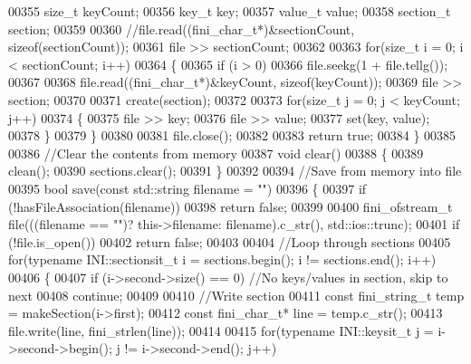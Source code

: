 \begin{DoxyCode}
00355       \textcolor{keywordtype}{size\_t} keyCount;
00356       key\_t key;
00357       value\_t value;
00358       section\_t section;
00359 
00360       \textcolor{comment}{//file.read((fini\_char\_t*)&sectionCount, sizeof(sectionCount));}
00361       file >> sectionCount;
00362 
00363       \textcolor{keywordflow}{for}(\textcolor{keywordtype}{size\_t} i = 0; i < sectionCount; i++)
00364       \{
00365          \textcolor{keywordflow}{if} (i > 0)
00366             file.seekg(1 + file.tellg());
00367 
00368          file.read((fini_char_t*)&keyCount, \textcolor{keyword}{sizeof}(keyCount));
00369          file >> section;
00370 
00371          create(section);
00372 
00373          \textcolor{keywordflow}{for}(\textcolor{keywordtype}{size\_t} j = 0; j < keyCount; j++)
00374          \{
00375             file >> key;
00376             file >> value;
00377             \textcolor{keyword}{set}(key, value);
00378          \}
00379       \}
00380 
00381       file.close();
00382 
00383       \textcolor{keywordflow}{return} \textcolor{keyword}{true};
00384    \}
00385 
00386    \textcolor{comment}{//Clear the contents from memory}
00387    \textcolor{keywordtype}{void} clear()
00388    \{
00389       clean();
00390       sections.clear();
00391    \}
00392 
00394    \textcolor{comment}{//Save from memory into file}
00395    \textcolor{keywordtype}{bool} save(\textcolor{keyword}{const} std::string filename = \textcolor{stringliteral}{""})
00396    \{
00397       \textcolor{keywordflow}{if} (!hasFileAssociation(filename))
00398          \textcolor{keywordflow}{return} \textcolor{keyword}{false};
00399 
00400       fini_ofstream_t file(((filename == \textcolor{stringliteral}{""})? this->filename: filename).c\_str(), std::ios::trunc);
00401       \textcolor{keywordflow}{if} (!file.is\_open())
00402          \textcolor{keywordflow}{return} \textcolor{keyword}{false};
00403 
00404       \textcolor{comment}{//Loop through sections}
00405       \textcolor{keywordflow}{for}(\textcolor{keyword}{typename} INI::sectionsit_t i = sections.begin(); i != sections.end(); 
      i++)
00406       \{
00407          \textcolor{keywordflow}{if} (i->second->size() == 0)  \textcolor{comment}{//No keys/values in section, skip to next}
00408             \textcolor{keywordflow}{continue};
00409 
00410          \textcolor{comment}{//Write section}
00411          \textcolor{keyword}{const} fini_string_t temp = makeSection(i->first);
00412          \textcolor{keyword}{const} fini_char_t* line = temp.c\_str();
00413          file.write(line, fini_strlen(line));
00414 
00415          \textcolor{keywordflow}{for}(\textcolor{keyword}{typename} INI::keysit_t j = i->second->begin(); j != i->second->end(); j++)

\end{DoxyCode}
